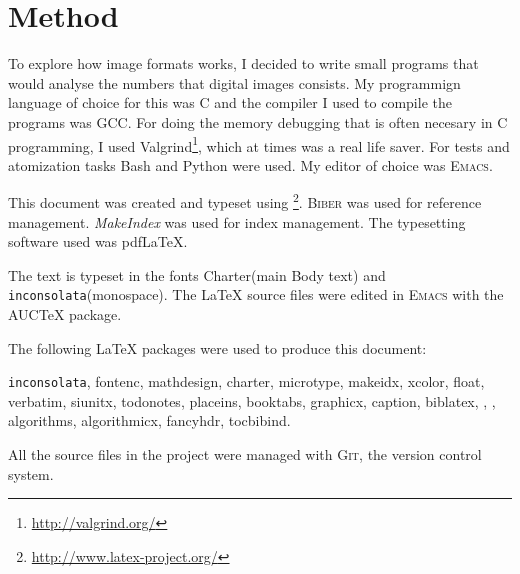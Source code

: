 \begin{comment}
  
\end{comment}

\chapter{Method}
\label{cha:method}

To explore how image formats works, I decided to write small programs
that would analyse the numbers that digital images consists. My
programmign language of choice for this was C and the compiler I used
to compile the programs was GCC. For doing the memory debugging that
is often necesary in C programming, I used
Valgrind\footnote{\url{http://valgrind.org/}}, which at times was a real
life saver. For tests and atomization tasks Bash and Python were
used. My editor of choice was \textsc{Emacs}.

This document was created and typeset using
\LaTeXe{}\footnote{\url{http://www.latex-project.org/}}. \textsc{Biber} was
used for reference management. \textit{MakeIndex} was used for index
management. The typesetting software used was pdf\LaTeX{}.

The text is typeset in the fonts Charter(main Body text) and
\texttt{inconsolata}(monospace). The \LaTeX{} source files were edited
in \textsc{Emacs} with the AUC\TeX{} package.

The following \LaTeX{} packages were used to produce this document:

\texttt{inconsolata}, fontenc, mathdesign, charter, microtype,
makeidx, xcolor, float, verbatim, siunitx, todonotes, placeins,
booktabs, graphicx, caption, biblatex, \tikzname, \pgf , algorithms,
algorithmicx, fancyhdr, tocbibind.

All the source files in the project were managed with \textsc{Git},
the version control system.

